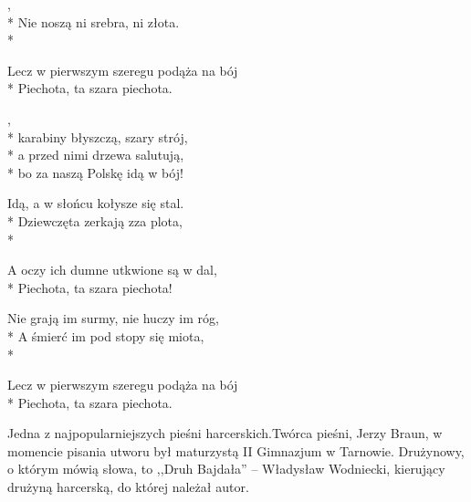 
\begin{lyrics}[longestline={Nie noszą lampasów, lecz szary ich strój,}]

,\\*
Nie noszą ni srebra, ni złota.\\*
\begin{markverses}[marktext={x2}]%
Lecz w pierwszym szeregu podąża na bój\\*
Piechota, ta szara piechota.
\end{markverses}

\begin{chorus}
,\\*
karabiny błyszczą, szary strój,\\*
a przed nimi drzewa salutują,\\*
bo za naszą Polskę idą w bój!
\end{chorus}

Idą, a w słońcu kołysze się stal.\\*
Dziewczęta zerkają zza plota,\\*
\begin{markverses}[marktext={x2}]%
A oczy ich dumne utkwione są w dal,\\*
Piechota, ta szara piechota!
\end{markverses}

\chorusref

Nie grają im surmy, nie huczy im róg,\\*
A śmierć im pod stopy się miota,\\*
\begin{markverses}[marktext={x2}]%
Lecz w pierwszym szeregu podąża na bój\\*
Piechota, ta szara piechota.
\end{markverses}

\chorusref
\end{lyrics}



\begin{info}Jedna z najpopularniejszych pieśni harcerskich.Twórca pieśni, Jerzy Braun, w momencie pisania utworu był maturzystą II Gimnazjum w Tarnowie. Drużynowy, o którym mówią słowa, to ,,Druh Bajdała'' – Władysław Wodniecki, kierujący drużyną harcerską, do której należał autor.\end{info}


